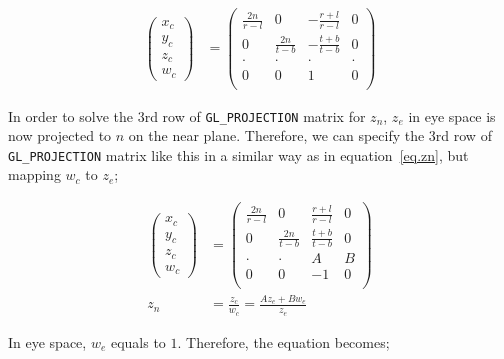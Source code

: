 \begin{equation}
    \begin{aligned}
        \begin{pmatrix} 
            x_{c}\\y_{c}\\z_{c}\\w_{c}
        \end{pmatrix} 
    &= 
        \begin{pmatrix} 
            \frac{2n}{r-l} & 0 & -\frac{r+l}{r-l} & 0 \\
            0 & \frac{2n}{t-b} & -\frac{t+b}{t-b} & 0 \\
            \cdot & \cdot & \cdot & \cdot \\
            0 & 0 & 1 & 0 \\
        \end{pmatrix}
    \end{aligned}
\end{equation}


In order to solve the 3rd row of \verb|GL_PROJECTION| matrix for $z_n$, $z_e$ in eye space is now projected to $n$ on the near plane. Therefore, we can specify the 3rd row of \verb|GL_PROJECTION| matrix like this in a similar way as in equation~\ref{eq.zn}, but mapping $w_c$ to $z_e$; 

\begin{equation}
    \begin{aligned}
        \begin{pmatrix} 
            x_{c}\\y_{c}\\z_{c}\\w_{c} 
        \end{pmatrix} &= 
        \begin{pmatrix} 
            \frac{2n}{r-l} & 0 & \frac{r+l}{r-l} & 0 \\
            0 & \frac{2n}{t-b} & \frac{t+b}{t-b} & 0 \\
            \cdot & \cdot & A & B \\
            0 & 0 & -1 & 0 \\
        \end{pmatrix} \\
        z_n &= \frac{z_c}{w_c}= \frac{Az_e+Bw_e}{z_e}
    \end{aligned}
\label{eq.newzn}
\end{equation}

In eye space, $w_e$ equals to $1$. Therefore, the equation becomes; 

